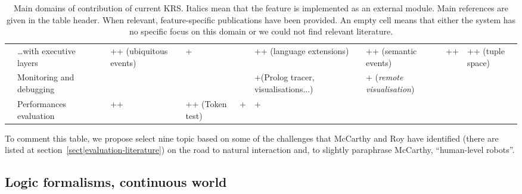 \documentclass[a4paper, twocolumn]{article}
\begin{document}
\begin{landscape}
\begin{table}
\begin{center}
\begin{tabular}{p{0.2cm}p{3.4cm}p{1.6cm}p{1.3cm}p{1.7cm}p{1.5cm}p{2cm}p{2cm}p{2cm}p{1.4cm}p{1.8cm}}
                                                      & \ldots with executive layers &                           & ++ (ubiquitous events)      & +                           &                             & ++ (language extensions) \cite{Beetz2010} &                                          & ++ (semantic events)                          & ++                            & ++ (tuple space)               \\
                                                          & Monitoring and debugging &                           &                             &                             &                             & +(Prolog tracer, visualisations...)&                                                 & + ({\em remote visualisation})                &                               &                                \\
                                                           & Performances evaluation &                           & ++ \cite{Hawes2008}         & ++ (Token test)             & +                           & + \cite{Tenorth2011}               &                                                 &                                               &                               &                                \\

\bottomrule

\end{tabular}
\end{center}

\caption{Main domains of contribution of current KRS. Italics mean that the
feature is implemented as an external module. Main references are given in the
table header. When relevant, feature-specific publications have been provided.
An empty cell means that either the system has no specific focus on this domain
or we could not find relevant literature.}

\label{table|contribution-by-systems}
\end{table}
\end{landscape}

To comment this table, we propose select nine topic based on some of the
challenges that McCarthy and Roy have identified (there are listed at
section~\ref{sect|evaluation-literature}) on the road to natural interaction
and, to slightly paraphrase McCarthy, ``human-level robots''.


\subsection{Logic formalisms, continuous world}
\end{document}
